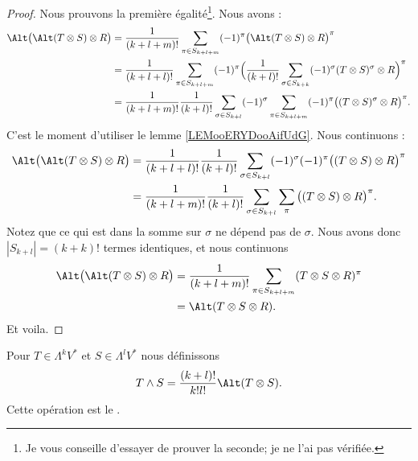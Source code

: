 \begin{proof}
	Nous prouvons la première égalité\footnote{Je vous conseille d'essayer de prouver la seconde; je ne l'ai pas vérifiée.}. Nous avons :
	\begin{subequations}
		\begin{align}
			\Alt\big( \Alt(T\otimes S)\otimes R \big) & =\frac{1}{ (k+l+m)!}\sum_{\pi\in S_{k+l+m}}(-1)^{\pi}\big( \Alt(T\otimes S)\otimes R \big)^{\pi}                                                             \\
			                                          & =\frac{1}{ (k+l+l)!}\sum_{\pi\in S_{k+l+m}}(-1)^{\pi}\Big( \frac{1}{ (k+l)!}\sum_{\sigma\in S_{k+k}}(-1)^{\sigma}(T\otimes S)^{\sigma}\otimes R \Big)^{\pi}  \\
			                                          & =\frac{1}{ (k+l+m)!}\frac{1}{ (k+l)!}\sum_{\sigma\in S_{k+l}}(-1)^{\sigma}\sum_{\pi\in S_{k+l+m}}(-1)^{\pi}\big( (T\otimes S)^{\sigma}\otimes R \big)^{\pi}.
		\end{align}
	\end{subequations}
	C'est le moment d'utiliser le lemme \ref{LEMooERYDooAifUdG}. Nous continuons :
	\begin{subequations}
		\begin{align}
			\Alt\big( \Alt(T\otimes S)\otimes R \big) & = \frac{1}{ (k+l+l)!}\frac{1}{ (k+l)!}\sum_{\sigma\in S_{k+l}}(-1)^{\sigma}(-1)^{\pi}\big( (T\otimes S)\otimes R \big)^{\pi} \\
			                                          & =\frac{1}{ (k+l+m)!}\frac{1}{ (k+l)!}\sum_{\sigma\in S_{k+l}}\sum_{\pi}\big( (T\otimes S)\otimes R \big)^{\pi}.
		\end{align}
	\end{subequations}
	Notez que ce qui est dans la somme sur \( \sigma\) ne dépend pas de \( \sigma\). Nous avons donc \( | S_{k+l} |=(k+k)!\) termes identiques, et nous continuons
	\begin{subequations}
		\begin{align}
			\Alt\big( \Alt(T\otimes S)\otimes R \big) & = \frac{1}{ (k+l+m)!}\sum_{\pi\in S_{k+l+m}}(T\otimes S\otimes R)^{\pi} \\
			                                          & =\Alt(T\otimes S\otimes R).
		\end{align}
	\end{subequations}
	Et voila.
\end{proof}

\begin{definition}
	Pour \( T\in \Lambda^kV^*\) et \( S\in\Lambda^lV^*\) nous définissons
	\begin{equation}
		T\wedge S=\frac{ (k+l)! }{ k!l! }\Alt(T\otimes S).
	\end{equation}
	Cette opération est le .
\end{definition}

